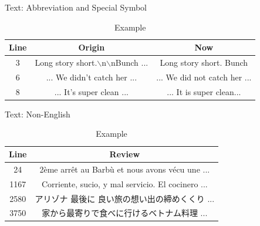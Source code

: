 \documentclass[10pt]{beamer}
\begin{document}
\begin{frame}{Text: Abbreviation and Special Symbol}


\begin{table}[ht]
\caption{Example} %
\centering %
\begin{tabular}{c c c} %
\hline %
Line & Origin & Now \\ [0.5ex] %
\hline %
3 & Long story short.$\backslash$n$\backslash$nBunch ... & Long story short.  Bunch \\
6 & ... We didn't catch her ... & ... We did not catch her ...  \\  
8 & ... It's super clean ... & ... It is super clean...  \\  
\hline %
\end{tabular}
\label{table:nonlin} %
\end{table}
\end{frame}



\begin{frame}{Text: Non-English}

\begin{table}[ht]
\caption{Example} %
\centering %
\begin{tabular}{c c} %
\hline %
Line & Review \\ [0.5ex] %

\hline %
24 & 2ème arrêt au Barbù et nous avons vécu une  ... \\  
1167 & Corriente, sucio, y mal servicio. El cocinero  ... \\  
2580 & アリゾナ 最後に 良い旅の想い出の締めくくり  ... \\  
3750 & 家から最寄りで食べに行けるベトナム料理 ...  \\  
\hline %
\end{tabular}
\label{table:nonlin} %
\end{table}
\end{frame}
\end{document}
